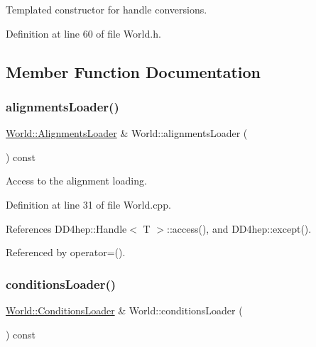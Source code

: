 Templated constructor for handle conversions. 



Definition at line 60 of file World.\+h.



\subsection{Member Function Documentation}
\hypertarget{class_d_d4hep_1_1_geometry_1_1_world_afb65fa4fa91e22fd96f4103d85158b3a}{}\label{class_d_d4hep_1_1_geometry_1_1_world_afb65fa4fa91e22fd96f4103d85158b3a} 
\subsubsection{\texorpdfstring{alignments\+Loader()}{alignmentsLoader()}}
{\footnotesize\ttfamily \hyperlink{class_d_d4hep_1_1_geometry_1_1_world_a4756d57ac9e7f6d43056b07dfbfe6904}{World\+::\+Alignments\+Loader} \& World\+::alignments\+Loader (\begin{DoxyParamCaption}{ }\end{DoxyParamCaption}) const}



Access to the alignment loading. 



Definition at line 31 of file World.\+cpp.



References D\+D4hep\+::\+Handle$<$ T $>$\+::access(), and D\+D4hep\+::except().



Referenced by operator=().

\hypertarget{class_d_d4hep_1_1_geometry_1_1_world_af15c1c1758a9f3603619d8a490a35c0a}{}\label{class_d_d4hep_1_1_geometry_1_1_world_af15c1c1758a9f3603619d8a490a35c0a} 
\subsubsection{\texorpdfstring{conditions\+Loader()}{conditionsLoader()}}
{\footnotesize\ttfamily \hyperlink{class_d_d4hep_1_1_geometry_1_1_world_aadddae79d9d6be44141befbbb4b7337b}{World\+::\+Conditions\+Loader} \& World\+::conditions\+Loader (\begin{DoxyParamCaption}{ }\end{DoxyParamCaption}) const}



